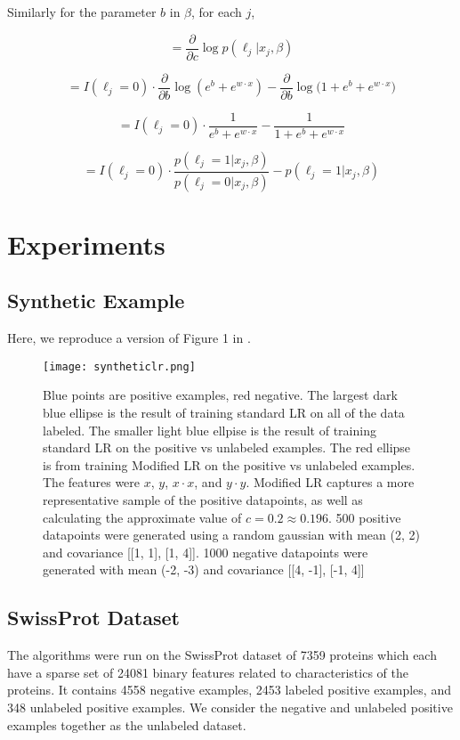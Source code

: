 \documentclass{article}
\begin{document}
Similarly for the parameter $b$ in $\beta$, for each $j$,


$$
 = \frac{\partial}{\partial c}\log{p(\ell_j | x_j, \beta)}
$$


$$
 = I(\ell_j=0) \cdot \frac{\partial}{\partial b}
		\log{  \left( e^b + e^{w \cdot x} \right) }
		- \frac{\partial}{\partial b}
		 \log{\bigg(
			1 + e^b + e^{w \cdot x}
		\bigg)}
$$


$$
 = I(\ell_j=0) \cdot
		\frac{1}{e^b + e^{w \cdot x}}
		-
		 \frac{1}{
			1 + e^b + e^{w \cdot x}
		}
$$


$$
 = I(\ell_j=0) \cdot
		\frac{p(\ell_j=1 | x_j,\beta)}{p(\ell_j=0 | x_j,\beta)}
		-
		 p(\ell_j=1 | x_j,\beta)
$$

\section{Experiments}

\subsection{Synthetic Example}

Here, we reproduce a version of Figure 1 in \cite{elkan08}. 

\label{Synthetic data}
\begin{figure}[ht!]
\centering
\texttt{[image: syntheticlr.png]}
\caption{Blue points are positive examples, red negative. The largest dark blue ellipse is the result of training standard LR on all of the data labeled. The smaller light blue ellpise is the result of training standard LR on the positive vs unlabeled examples. The red ellipse is from training Modified LR on the positive vs unlabeled examples. The features were $x$, $y$, $x \cdot x$, and $y \cdot y$.  Modified LR captures a more representative sample of the positive datapoints, as well as calculating the approximate value of $c = 0.2 \approx 0.196$.   500 positive datapoints were generated using a random gaussian with mean (2, 2) and covariance [[1, 1], [1, 4]].  1000 negative datapoints were generated with mean (-2, -3) and covariance [[4, -1], [-1, 4]]}
\end{figure}


\subsection{SwissProt Dataset}

The algorithms were run on the SwissProt\cite{elkan08} dataset of 7359 proteins which each have a sparse set of 24081 binary features related to characteristics of the proteins. It contains 4558 negative examples, 2453 labeled positive examples, and 348 unlabeled positive examples.   We consider the negative and unlabeled positive examples together as the unlabeled dataset.
\end{document}
